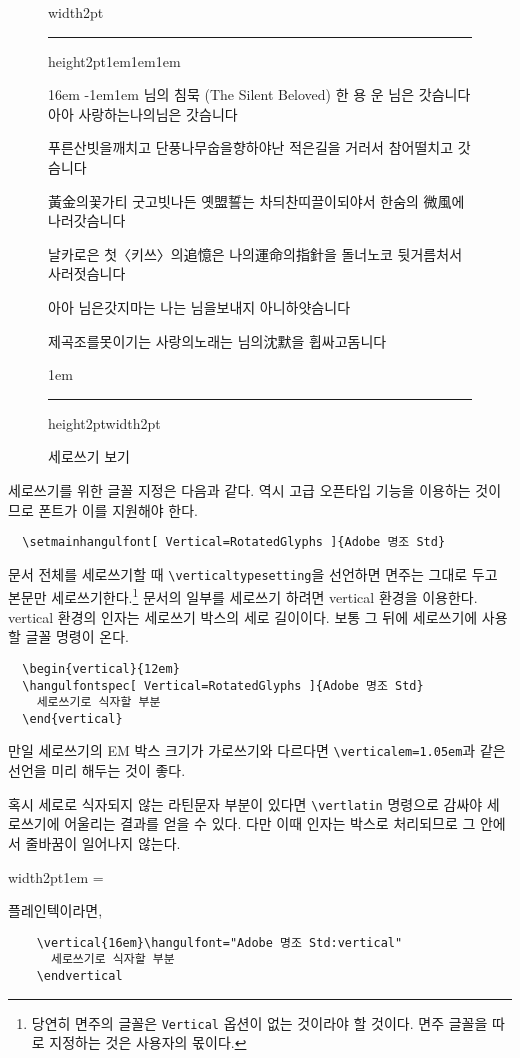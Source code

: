 \documentclass[a4paper]{article}
\def\grayhrule{\color{white!80!black}\hrule height2pt\color{black}}
\def\grayvrule{\color{white!80!black}\vrule width2pt\color{black}}
\newenvironment{plaintex}
  {\par\medskip\leavevmode\hbox\bgroup\grayvrule\kern1em
    \vbox\bgroup\hsize=\dimexpr\textwidth-12pt\relax\small
  }{\egroup\egroup\par\medskip}
\newenvironment{example}
  {\leavevmode\hbox\bgroup\grayvrule
    \vbox\bgroup\hsize\dimexpr\textwidth-4pt\relax
    \grayhrule\kern1em\leftskip1em\rightskip1em
  }{\par\kern1em\grayhrule\egroup\grayvrule\egroup}
\def\cs#1{\texttt{\color{blue!50!black}\textbackslash #1}}
\begin{document}
\begin{figure}
\begin{example}
\hfil\begin{vertical}{16em}
  \hangulmarks \hanjabyhangulfont \parindent-1em\leftskip1em
\noindent 님의 침묵 {\small(The Silent Beloved)}
\smallbreak
\hfil\hfil 한 용 운\hfil
\bigbreak
님은 갓슴니다 아아 사랑하는나의님은 갓슴니다\par
푸른산빗을깨치고 단풍나무숩을향하야난 적은길을 거러서 참어떨치고 갓슴니다\par
黃金의꽃가티 굿고빗나든 옛盟誓는 차듸찬띠끌이되야서 한숨의 微風에 나러갓슴니다\par
날카로은 첫〈키쓰〉의追憶은 나의運命의指針을 돌너노코 뒷거름처서 사러젓슴니다\par
\hellipsis\par
아아 님은갓지마는 나는 님을보내지 아니하얏슴니다\par
제곡조를못이기는 사랑의노래는 님의沈默을 휩싸고돔니다\par
\end{vertical}\hfil
\end{example}
\caption{세로쓰기 보기}\label{fig:vertical}
\end{figure}

세로쓰기를 위한 글꼴 지정은 다음과 같다.
역시 고급 오픈타입 기능을 이용하는 것이므로
폰트가 이를 지원해야 한다.
\begin{verbatim}
  \setmainhangulfont[ Vertical=RotatedGlyphs ]{Adobe 명조 Std}
\end{verbatim}
문서 전체를 세로쓰기할 때 \cs{verticaltypesetting}을 선언하면
면주는 그대로 두고 본문만 세로쓰기한다.\footnote{당연히 면주의 글꼴은
\texttt{Vertical} 옵션이 없는 것이라야 할 것이다.
면주 글꼴을 따로 지정하는 것은 사용자의 몫이다. }
문서의 일부를 세로쓰기 하려면 vertical 환경을 이용한다.
vertical 환경의 인자는 세로쓰기 박스의 세로 길이이다.
보통 그 뒤에  세로쓰기에 사용할 글꼴 명령이 온다.
\begin{verbatim}
  \begin{vertical}{12em}
  \hangulfontspec[ Vertical=RotatedGlyphs ]{Adobe 명조 Std}
    세로쓰기로 식자할 부분
  \end{vertical}
\end{verbatim}
만일 세로쓰기의 EM 박스 크기가 가로쓰기와 다르다면
\cs{verticalem=1.05em}과 같은 선언을 미리 해두는 것이 좋다.

혹시 세로로 식자되지 않는 라틴문자 부분이 있다면
\cs{vertlatin} 명령으로 감싸야 세로쓰기에 어울리는
결과를 얻을 수 있다. 다만 이때 인자는 박스로 처리되므로
그 안에서 줄바꿈이 일어나지 않는다.
\medbreak
\begin{plaintex}
플레인텍이라면,
\begin{verbatim}
    \vertical{16em}\hangulfont="Adobe 명조 Std:vertical"
      세로쓰기로 식자할 부분
    \endvertical
\end{verbatim}
\end{plaintex}
\end{document}

